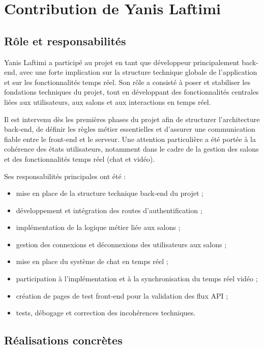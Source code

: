 \documentclass[12pt,a4paper]{report}
\begin{document}
\section{Contribution de Yanis Laftimi}

\subsection*{Rôle et responsabilités}

Yanis Laftimi a participé au projet en tant que développeur principalement back-end, avec une forte implication sur la structure technique globale de l’application et sur les fonctionnalités temps réel. Son rôle a consisté à poser et stabiliser les fondations techniques du projet, tout en développant des fonctionnalités centrales liées aux utilisateurs, aux salons et aux interactions en temps réel.

Il est intervenu dès les premières phases du projet afin de structurer l’architecture back-end, de définir les règles métier essentielles et d’assurer une communication fiable entre le front-end et le serveur. Une attention particulière a été portée à la cohérence des états utilisateurs, notamment dans le cadre de la gestion des salons et des fonctionnalités temps réel (chat et vidéo).

Ses responsabilités principales ont été :

\begin{itemize}
  \item mise en place de la structure technique back-end du projet ;
  \item développement et intégration des routes d’authentification ;
  \item implémentation de la logique métier liée aux salons ;
  \item gestion des connexions et déconnexions des utilisateurs aux salons ;
  \item mise en place du système de chat en temps réel ;
  \item participation à l’implémentation et à la synchronisation du temps réel vidéo ;
  \item création de pages de test front-end pour la validation des flux API ;
  \item tests, débogage et correction des incohérences techniques.
\end{itemize}

\subsection*{Réalisations concrètes}
\end{document}
